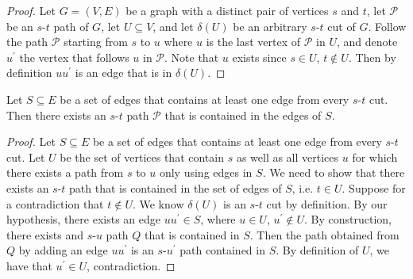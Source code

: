 \begin{proof}
    Let $ G=(V,E) $ be a graph with a distinct pair of vertices $ s $ and $ t $,
    let $ \mathcal{P} $ be an $ s $-$ t $ path of $ G $,  let $ U\subseteq V $,
    and let $ \delta(U) $ be an arbitrary $ s $-$ t $ cut of $ G $. Follow
    the path $ \mathcal{P} $ starting from $ s $ to $ u $ where $ u $ is the last vertex
    of $ \mathcal{P} $ in $ U $, and denote $ u^\prime $ the vertex that follows
    $ u $ in $ \mathcal{P} $. Note that $ u $ exists since $ s\in U $, $ t\notin U $.
    Then by definition $ uu^\prime $ is an edge that is in $ \delta(U) $.
\end{proof}

\begin{thmbox}
    \begin{theorem}
        Let $ S\subseteq E $ be a set of edges that contains at least one edge from every
        $s$-$t$ cut. Then there exists an $s$-$t$ path $ \mathcal{P} $ that is contained
        in the edges of $ S $.
    \end{theorem}
\end{thmbox}

\begin{proof}
    Let $ S\subseteq E $ be a set of edges that contains at least one edge from every
    $s$-$t$ cut. Let $ U $ be the set of vertices that contain $ s $ as well
    as all vertices $ u $ for which there exists a path from $ s $ to
    $ u $ only using edges in $ S $. We need to show that there exists
    an $s$-$t$ path that is contained in the set of edges of $ S $, i.e.
    $ t\in U $. Suppose for a contradiction that $ t\notin U $. We know
    $ \delta(U) $ is an $s$-$t$ cut by definition. By our hypothesis,
    there exists an edge $ uu^\prime\in S $, where $ u\in U $, $ u^\prime\notin U $.
    By construction, there exists and $s$-$u$ path $Q$ that is contained in $ S $.
    Then the path obtained from $ Q $ by adding an edge $ uu^\prime $ is
    an $s$-$u^\prime$ path contained in $ S $. By definition of $ U $,
    we have that $ u^\prime\in U $, contradiction. 
\end{proof}

\begin{figure}
    \centering
    \def\svgwidth{\columnwidth}
    \scalebox{0.5}{}
\end{figure}

